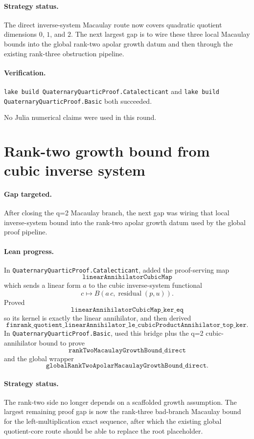 \documentclass[11pt]{article}
\begin{document}
\paragraph{Strategy status.}
The direct inverse-system Macaulay route now covers quadratic quotient
dimensions \(0\), \(1\), and \(2\).  The next largest gap is to wire these
three local Macaulay bounds into the global rank-two apolar growth datum and
then through the existing rank-three obstruction pipeline.

\paragraph{Verification.}
\texttt{lake build QuaternaryQuarticProof.Catalecticant} and
\texttt{lake build QuaternaryQuarticProof.Basic} both succeeded.

No Julia numerical claims were used in this round.

\section*{Rank-two growth bound from cubic inverse system}

\paragraph{Gap targeted.}
After closing the q=2 Macaulay branch, the next gap was wiring that local
inverse-system bound into the rank-two apolar growth datum used by the global
proof pipeline.

\paragraph{Lean progress.}
In \texttt{QuaternaryQuarticProof.Catalecticant}, added the proof-serving map
\[
\texttt{linearAnnihilatorCubicMap}
\]
which sends a linear form \(a\) to the cubic inverse-system functional
\[
c\mapsto B(a\,c,\operatorname{residual}(p,u)).
\]
Proved
\[
\texttt{linearAnnihilatorCubicMap\_ker\_eq}
\]
so its kernel is exactly the linear annihilator, and then derived
\[
\texttt{finrank\_quotient\_linearAnnihilator\_le\_cubicProductAnnihilator\_top\_ker}.
\]
In \texttt{QuaternaryQuarticProof.Basic}, used this bridge plus the q=2
cubic-annihilator bound to prove
\[
\texttt{rankTwoMacaulayGrowthBound\_direct}
\]
and the global wrapper
\[
\texttt{globalRankTwoApolarMacaulayGrowthBound\_direct}.
\]

\paragraph{Strategy status.}
The rank-two side no longer depends on a scaffolded growth assumption.  The
largest remaining proof gap is now the rank-three bad-branch Macaulay bound
for the left-multiplication exact sequence, after which the existing global
quotient-core route should be able to replace the root placeholder.
\end{document}
